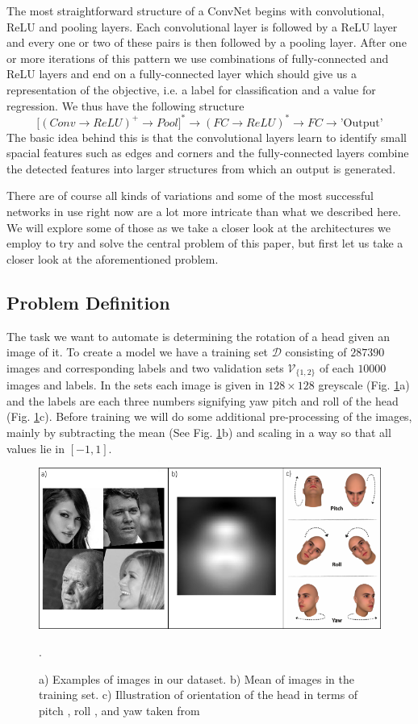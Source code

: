 \documentclass[preprint,12pt,3p]{elsarticle}
\begin{document}
The most straightforward structure of a ConvNet begins with convolutional, ReLU and pooling layers. Each convolutional layer is followed by a ReLU layer and every one or two of these pairs is then followed by a pooling layer. After one or more iterations of this pattern we use combinations of fully-connected and ReLU layers and end on a fully-connected layer which should give us a representation of the objective, i.e. a label for classification and a value for regression. We thus have the following structure
$$\big[(Conv\rightarrow ReLU)^+\rightarrow Pool\big]^*\rightarrow (FC\rightarrow ReLU)^*\rightarrow FC\rightarrow\mbox{'Output'}$$
The basic idea behind this is that the convolutional layers learn to identify small spacial features such as edges and corners and the fully-connected layers combine the detected features into larger structures from which an output is generated.

There are of course all kinds of variations and some of the most successful networks in use right now are a lot more intricate than what we described here. We will explore some of those as we take a closer look at the architectures we employ to try and solve the central problem of this paper, but first let us take a closer look at the aforementioned problem.

\subsection{Problem Definition}

The task we want to automate is determining the rotation of a head given an image of it. To create a model we have a training set $\mathcal{D}$ consisting of $287390$ images and corresponding labels and two validation sets $\mathcal{V}_{\{1,2\}}$ of each $10000$ images and labels. In the sets each image is given in $128\times128$ greyscale (Fig. \ref{fig:data}a) and the labels are each three numbers signifying yaw pitch and roll of the head (Fig. \ref{fig:data}c). Before training we will do some additional pre-processing of the images, mainly by subtracting the mean (See Fig. \ref{fig:data}b) and scaling in a way so that all values lie in $[-1,1]$. 

\begin{figure}
    \centering
    \includegraphics[scale=0.8]{figures/data.png}
    \caption{a) Examples of images in our dataset. b) Mean of images in the training set. c) Illustration of orientation of the head in terms of pitch , roll , and yaw taken from \cite{arcoverde2014enhanced}}.
    \label{fig:data}
\end{figure}
\end{document}

